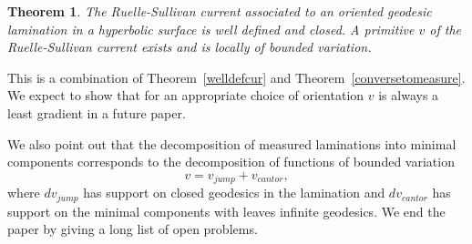 \documentclass{ip-journal}
\newtheorem{theorem}{Theorem}[section]
\theoremstyle{definition}
\numberwithin{equation}{section}
\begin{document}
 \begin{theorem}The Ruelle-Sullivan current associated to an oriented geodesic lamination in a hyperbolic surface is well defined and closed. A primitive $v$ of the  Ruelle-Sullivan current exists and is locally of bounded variation.
 \end{theorem} 
 This is a combination of Theorem~\ref{welldefcur} and Theorem~\ref{conversetomeasure}. We expect to show that for an appropriate choice of orientation $v$ is always a least gradient in a future paper.   
 
 
 We also point out that the decomposition of measured laminations into minimal components  corresponds to the decomposition of functions of bounded variation
 \[ 
 v = v_{jump} + v_{cantor},
 \]
 where $dv_{jump}$ has support on closed geodesics in the lamination and $dv_{cantor}$ has support on the minimal components with leaves infinite  geodesics.
 We end the paper by giving a  long list of open problems. 
 \vspace{.1 in}
 
\end{document}
